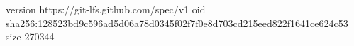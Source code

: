 version https://git-lfs.github.com/spec/v1
oid sha256:128523bd9c596ad5d06a78d0345f02f7f0e8d703cd215eed822f1641ce624c53
size 270344
